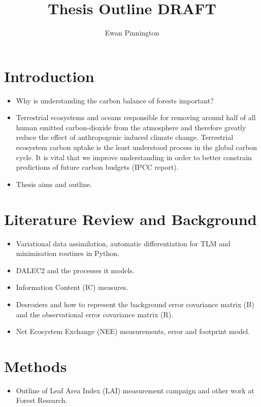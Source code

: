 \documentclass[11pt]{article}
\title{Thesis Outline DRAFT}
\author{Ewan Pinnington}
\begin{document}
\maketitle

\section{Introduction}
\begin{itemize}
\item Why is understanding the carbon balance of forests important?
\item Terrestrial ecosystems and oceans responsible for removing around half of all human emitted carbon-dioxide from the atmosphere and therefore greatly reduce the effect of anthropogenic induced climate change. Terrestrial ecosystem carbon uptake is the least understood process in the global carbon cycle. It is vital that we improve understanding in order to better constrain predictions of future carbon budgets (IPCC report).
\item Thesis aims and outline.
\end{itemize}


\section{Literature Review and Background}
\begin{itemize}
\item Variational data assimilation, automatic differentiation for TLM and minimisation routines in Python.
\item DALEC2 and the processes it models.
\item Information Content (IC) measures.
\item Desroziers and how to represent the background error covariance matrix (B) and the observational error covariance matrix (R).
\item Net Ecosystem Exchange (NEE) measurements, error and footprint model.
\end{itemize}


\section{Methods}
\begin{itemize}
\item Outline of Leaf Area Index (LAI) measurement campaign and other work at Forest Research.
\end{itemize}
\end{document}
